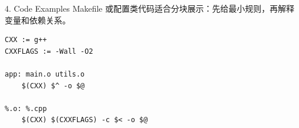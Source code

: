 \documentclass[aspectratio=169,10pt]{beamer}
\begin{document}
\begin{frame}[fragile]{4. Code Examples}
Makefile 或配置类代码适合分块展示：先给最小规则，再解释变量和依赖关系。

\begin{verbatim}
CXX := g++
CXXFLAGS := -Wall -O2

app: main.o utils.o
    $(CXX) $^ -o $@

%.o: %.cpp
    $(CXX) $(CXXFLAGS) -c $< -o $@
\end{verbatim}
\end{frame}

\end{document}
